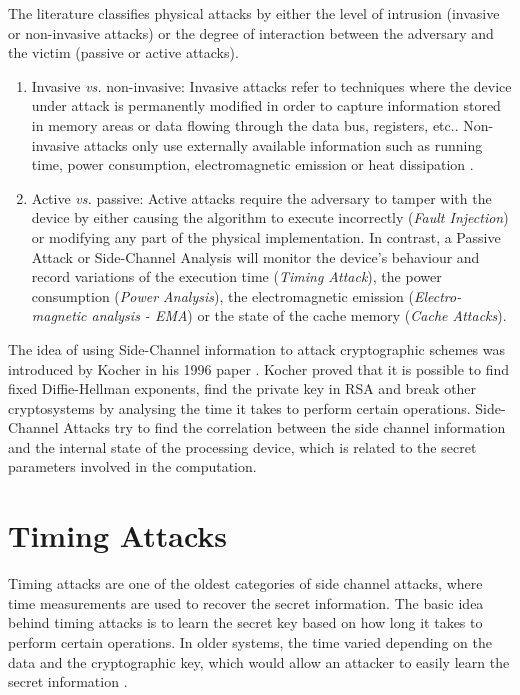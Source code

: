 \documentclass[10pt,a4paper,twoside]{book}
\begin{document}
The literature classifies physical attacks by either the level of intrusion (invasive or non-invasive attacks) or the degree of interaction between the adversary and the victim (passive or active attacks).
\begin{enumerate}
\item Invasive \textit{vs.} non-invasive: Invasive attacks refer to techniques where the device under attack is permanently modified in order to capture information stored in memory areas or data flowing through the data bus, registers, etc.\cite{Tria2011}. Non-invasive attacks only use externally available information such as running time, power consumption, electromagnetic emission or heat dissipation \cite{standaert2010introduction}.
\item Active \textit{vs.} passive: Active attacks require the adversary to tamper with the device by either causing the algorithm to execute incorrectly (\textit{Fault Injection}) or modifying any part of the physical implementation. In contrast, a Passive Attack or Side-Channel Analysis will monitor the device's behaviour and record variations of the execution time (\textit{Timing Attack}), the power consumption (\textit{Power Analysis}), the electromagnetic emission (\textit{Electro-magnetic analysis - EMA}) or the state of the cache memory (\textit{Cache Attacks}).
\end{enumerate}

The idea of using Side-Channel information to attack cryptographic schemes was introduced by Kocher in his 1996 paper \cite{kocher1996timing}. Kocher proved that it is possible to find fixed Diffie-Hellman \cite{diffie1976new} exponents, find the private key in RSA \cite{rivest1978method} and break other cryptosystems by analysing the time it takes to perform certain operations. Side-Channel Attacks try to find the correlation between the side channel information and the internal state of the processing device, which is related to the secret parameters involved in the computation. 

\section{Timing Attacks}
\label{tb:timingattacks}

Timing attacks are one of the oldest categories of side channel attacks, where time measurements are used to recover the secret information. The basic idea behind timing attacks is to learn the secret key based on how long it takes to perform certain operations. In older systems, the time varied depending on the data and the cryptographic key, which would allow an attacker to easily learn the secret information \cite{Koeune2011}.
\end{document}
